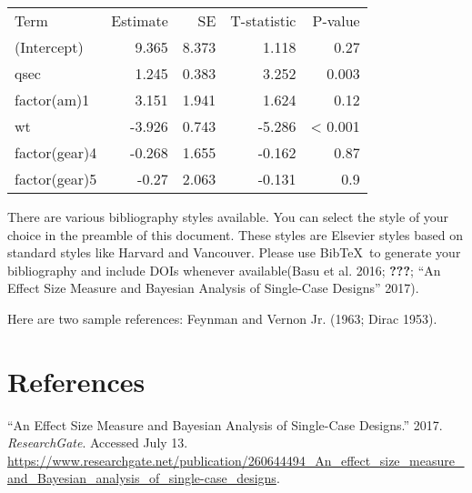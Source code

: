 \documentclass[]{elsarticle} %
\begin{document}
\begin{table}
\centering

\label{tab:unnamed-chunk-2}\begin{tabular}{lrrrr}
  \multicolumn{1}{l}{Term} & \multicolumn{1}{r}{Estimate} & \multicolumn{1}{r}{SE} & \multicolumn{1}{r}{T-statistic} & \multicolumn{1}{r}{P-value}   \\ 
 \multicolumn{1}{l}{(Intercept)} & \multicolumn{1}{r}{9.365} & \multicolumn{1}{r}{8.373} & \multicolumn{1}{r}{1.118} & \multicolumn{1}{r}{0.27}   \\ 
 \multicolumn{1}{l}{qsec} & \multicolumn{1}{r}{1.245} & \multicolumn{1}{r}{0.383} & \multicolumn{1}{r}{3.252} & \multicolumn{1}{r}{0.003}   \\ 
 \multicolumn{1}{l}{factor(am)1} & \multicolumn{1}{r}{3.151} & \multicolumn{1}{r}{1.941} & \multicolumn{1}{r}{1.624} & \multicolumn{1}{r}{0.12}   \\ 
 \multicolumn{1}{l}{wt} & \multicolumn{1}{r}{-3.926} & \multicolumn{1}{r}{0.743} & \multicolumn{1}{r}{-5.286} & \multicolumn{1}{r}{< 0.001}   \\ 
 \multicolumn{1}{l}{factor(gear)4} & \multicolumn{1}{r}{-0.268} & \multicolumn{1}{r}{1.655} & \multicolumn{1}{r}{-0.162} & \multicolumn{1}{r}{0.87}   \\ 
 \multicolumn{1}{l}{factor(gear)5} & \multicolumn{1}{r}{-0.27} & \multicolumn{1}{r}{2.063} & \multicolumn{1}{r}{-0.131} & \multicolumn{1}{r}{0.9}   \\ 

 \end{tabular}
\end{table}

There are various bibliography styles available. You can select the
style of your choice in the preamble of this document. These styles are
Elsevier styles based on standard styles like Harvard and Vancouver.
Please use BibTeX~to generate your bibliography and include DOIs
whenever available(Basu et al. 2016; {\textbf{???}}; ``An Effect Size
Measure and Bayesian Analysis of Single-Case Designs'' 2017).

Here are two sample references: Feynman and Vernon Jr. (1963; Dirac
1953).

\section*{References}\label{references}

\hypertarget{refs}{}
\hypertarget{ref-noauthor_effect_nodate}{}
``An Effect Size Measure and Bayesian Analysis of Single-Case Designs.''
2017. \emph{ResearchGate}. Accessed July 13.
\url{https://www.researchgate.net/publication/260644494_An_effect_size_measure_and_Bayesian_analysis_of_single-case_designs}.
\end{document}
